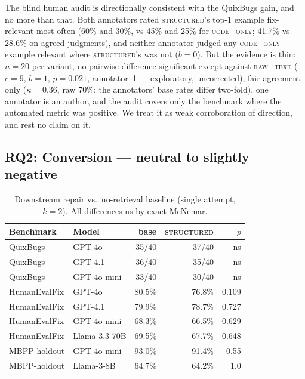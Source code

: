 \documentclass[10pt,conference,a4paper]{IEEEtran}
\newcommand{\structured}{\textsc{structured}\xspace}
\newcommand{\codeonly}{\textsc{code\_only}\xspace}
\begin{document}
The blind human audit is directionally consistent with the QuixBugs gain,
and no more than that. Both annotators rated \structured's top-1 example
fix-relevant most often (60\% and 30\%, vs 45\% and 25\% for \codeonly;
41.7\% vs 28.6\% on agreed judgments), and neither annotator judged any
\codeonly example relevant where \structured's was not ($b{=}0$). But the
evidence is thin: $n{=}20$ per variant, no pairwise difference significant
except against \textsc{raw\_text} ($c{=}9$, $b{=}1$, $p{=}0.021$,
annotator~1 --- exploratory, uncorrected), fair agreement only
($\kappa{=}0.36$, raw 70\%; the annotators' base rates differ two-fold),
one annotator is an author, and the audit covers only the benchmark where
the automated metric was positive. We treat it as weak corroboration of
direction, and rest no claim on it.

\subsection{RQ2: Conversion --- neutral to slightly negative}

\begin{table}[t]
\caption{Downstream repair vs.\ no-retrieval baseline (single attempt,
$k{=}2$). All differences ns by exact McNemar.}
\label{tab:downstream}
\centering
\begin{tabular}{llrrr}
\toprule
Benchmark & Model & base & \structured & $p$ \\
\midrule
QuixBugs & GPT-4o & 35/40 & 37/40 & ns \\
QuixBugs & GPT-4.1 & 36/40 & 35/40 & ns \\
QuixBugs & GPT-4o-mini & 33/40 & 30/40 & ns \\
HumanEvalFix & GPT-4o & 80.5\% & 76.8\% & 0.109 \\
HumanEvalFix & GPT-4.1 & 79.9\% & 78.7\% & 0.727 \\
HumanEvalFix & GPT-4o-mini & 68.3\% & 66.5\% & 0.629 \\
HumanEvalFix & Llama-3.3-70B & 69.5\% & 67.7\% & 0.648 \\
MBPP-holdout & GPT-4o-mini & 93.0\% & 91.4\% & 0.55 \\
MBPP-holdout & Llama-3-8B & 64.7\% & 64.2\% & 1.0 \\
\bottomrule
\end{tabular}
\end{table}
\end{document}
